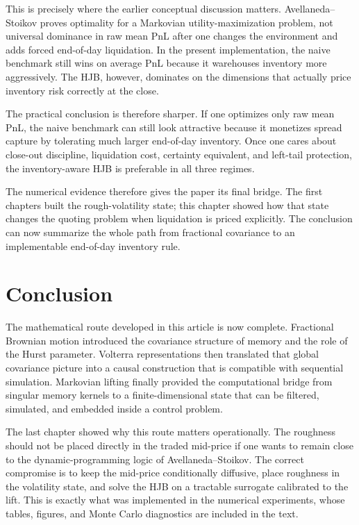 \documentclass[a4paper,10pt,titlepage,oneside,openany]{book}
\theoremstyle{plain}
\theoremstyle{definition}
\theoremstyle{remark}
\newcommand{\1}{\mathbf{1}}
\begin{document}
This is precisely where the earlier conceptual discussion matters. Avellaneda--Stoikov proves optimality for a Markovian utility-maximization problem, not universal dominance in raw mean PnL after one changes the environment and adds forced end-of-day liquidation. In the present implementation, the naive benchmark still wins on average PnL because it warehouses inventory more aggressively. The HJB, however, dominates on the dimensions that actually price inventory risk correctly at the close.

The practical conclusion is therefore sharper. If one optimizes only raw mean PnL, the naive benchmark can still look attractive because it monetizes spread capture by tolerating much larger end-of-day inventory. Once one cares about close-out discipline, liquidation cost, certainty equivalent, and left-tail protection, the inventory-aware HJB is preferable in all three regimes.

The numerical evidence therefore gives the paper its final bridge. The first chapters built the rough-volatility state; this chapter showed how that state changes the quoting problem when liquidation is priced explicitly. The conclusion can now summarize the whole path from fractional covariance to an implementable end-of-day inventory rule.

\chapter*{Conclusion}

The mathematical route developed in this article is now complete. Fractional Brownian motion introduced the covariance structure of memory and the role of the Hurst parameter. Volterra representations then translated that global covariance picture into a causal construction that is compatible with sequential simulation. Markovian lifting finally provided the computational bridge from singular memory kernels to a finite-dimensional state that can be filtered, simulated, and embedded inside a control problem.

The last chapter showed why this route matters operationally. The roughness should not be placed directly in the traded mid-price if one wants to remain close to the dynamic-programming logic of Avellaneda--Stoikov. The correct compromise is to keep the mid-price conditionally diffusive, place roughness in the volatility state, and solve the HJB on a tractable surrogate calibrated to the lift. This is exactly what was implemented in the numerical experiments, whose tables, figures, and Monte Carlo diagnostics are included in the text.
\end{document}
